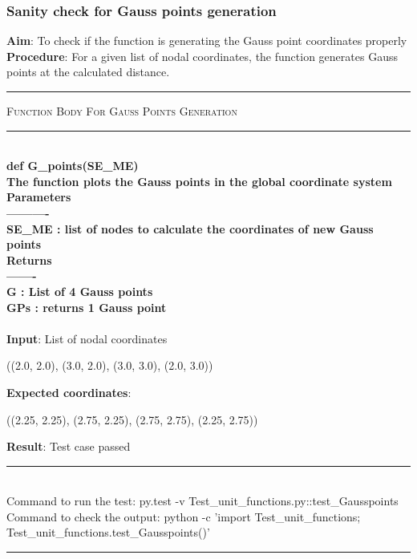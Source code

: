 \documentclass[fleqn, 12.5pt,a4paper]{report}
\begin{document}
\subsubsection{Sanity check for Gauss points generation}
\textbf{Aim}: To check if the function is generating the Gauss point coordinates properly  \newline
\textbf{Procedure}: For a given list of nodal coordinates, the function generates Gauss points at the calculated distance.
\\
{ \rule{\linewidth}{0.05cm}}
	{\scshape Function Body For Gauss Points Generation}\\
{ \rule{\linewidth}{0.05cm}}
{\selectfont
\\
\textbf{def G{\_}points(SE{\_}ME)\\
    The function plots the Gauss points in the global coordinate system\\
    Parameters\\
    ----------\\
    SE{\_}ME : list of nodes to calculate the coordinates of new Gauss points\\
    Returns\\
    -------\\
    G : List of 4 Gauss points\\
    GPs : returns 1 Gauss point\\
    }}\\
\textbf{Input}: List of nodal coordinates
\begin{center}
((2.0, 2.0), (3.0, 2.0), (3.0, 3.0), (2.0, 3.0))\\
\end{center}
\hspace{-0.15cm}
\textbf{Expected coordinates}:
\begin{center}
((2.25, 2.25), (2.75, 2.25), (2.75, 2.75), (2.25, 2.75))
\end{center}
\textbf{Result}: Test case passed
\\
{\rule{\linewidth}{0.02cm}}\\
Command to run the test: {\selectfont py.test -v Test{\_}unit{\_}functions.py::test{\_}Gausspoints}\\
Command to check the output: {\selectfont python -c 'import Test{\_}unit{\_}functions;\\ Test{\_}unit{\_}functions.test{\_}Gausspoints()'}\\
{\rule{\linewidth}{0.02cm}}
\end{document}

